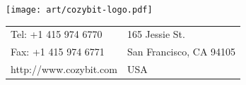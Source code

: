 \documentclass[12pt,landscape,twocolumn]{article}
\begin{document}
\strut{\vspace{2.5in}}
\begin{center}
\texttt{[image: art/cozybit-logo.pdf]}\\
\vspace{3ex}
{\scriptsize 
\begin{tabular}{l l}
Tel: +1 415 974 6770   & 165 Jessie St. \\
Fax: +1 415 974 6771    & San Francisco, CA 94105 \\
http://www.cozybit.com  & USA \\
\end{tabular}}
\end{center}
\end{document}
